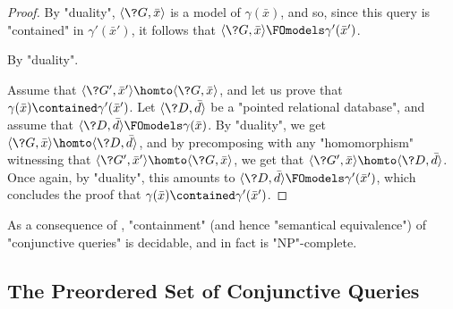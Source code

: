 \begin{proof}
	By "duality", $\tup{\?G, \bar x}$ is a model of $\gamma(\bar x)$,
	and so, since this query is "contained" in $\gamma'(\bar x')$,
	it follows that $\tup{\?G, \bar x} \FOmodels \gamma'(\bar x')$.

	 By "duality".

	 Assume that
	$\tup{\?G', \bar x'} \homto \tup{\?G, \bar x}$,
	and let us prove that $\gamma(\bar x) \contained \gamma'(\bar x')$.
	Let $\tup{\?D, \bar d}$ be a "pointed relational database",
	and assume that $\tup{\?D, \bar d} \FOmodels \gamma(\bar x)$.
	By "duality", we get $\tup{\?G, \bar x} \homto \tup{\?D, \bar d}$,
	and by precomposing with any "homomorphism" witnessing
	that $\tup{\?G', \bar x'} \homto \tup{\?G, \bar x}$,
	we get that $\tup{\?G', \bar x} \homto \tup{\?D, \bar d}$.
	Once again, by "duality", this amounts to $\tup{\?D, \bar d} \FOmodels \gamma'(\bar x')$,
	which concludes the proof that $\gamma(\bar x) \contained \gamma'(\bar x')$.
\end{proof}

As a consequence of , "containment" (and hence "semantical equivalence") of "conjunctive queries" is decidable, and in fact is "NP"-complete.


\subsection{The Preordered Set of Conjunctive Queries}

